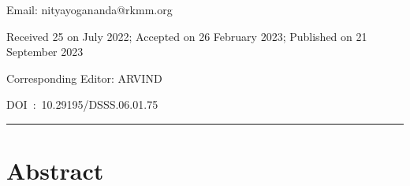 \documentclass[twoside, 13pt]{article}
\begin{document}
Email: nityayogananda@rkmm.org 


\vspace{.3cm}

Received 25 on July 2022; Accepted on 26 February 2023; Published on 21 September 2023

\vspace{.3cm}

Corresponding Editor: ARVIND

\vspace{.3cm}

DOI~:~10.29195/DSSS.06.01.75





  

\noindent\rule{\textwidth}{0.2mm}


\vspace{-.7cm}


{\fontsize{18}{20}\selectfont\section*{Abstract}}

\vspace{-.2cm}
\end{document}
